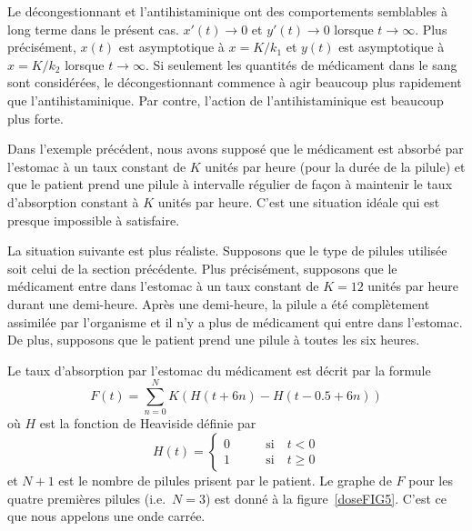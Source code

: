 {\begin{egg}


Le décongestionnant et l'antihistaminique ont des comportements semblables à
long terme dans le présent cas.  $x'(t) \rightarrow 0$ et
$y'(t) \rightarrow 0$ lorsque $t \rightarrow \infty$.  Plus précisément,
$x(t)$ est asymptotique à $x = K/k_1$ et $y(t)$ est asymptotique à
$x = K/k_2$ lorsque $t \rightarrow \infty$.  Si seulement les 
quantités de médicament dans le sang sont considérées, le
décongestionnant commence à agir beaucoup plus rapidement que
l'antihistaminique.  Par contre, l'action de l'antihistaminique est
beaucoup plus forte.


Dans l'exemple précédent, nous avons supposé que le médicament est
absorbé par l'estomac à un taux constant de $K$ unités par heure (pour
la durée de la pilule) et que le patient prend une pilule à intervalle
régulier de façon à maintenir le taux d'absorption constant à $K$
unités par heure.  C'est une situation idéale qui est presque
impossible à satisfaire.

La situation suivante est plus réaliste.  Supposons que le type de pilules
utilisée soit celui de la section précédente.  Plus précisément,
supposons que le médicament entre dans l'estomac à un taux constant de
$K=12$ unités par heure durant une demi-heure.  Après une demi-heure,
la pilule a été complètement assimilée par l'organisme et il n'y a
plus de médicament qui entre dans l'estomac.  De plus, supposons
que le patient prend une pilule à toutes les six heures.

Le taux d'absorption par l'estomac du médicament est décrit par la formule
\[
F(t) = \sum_{n=0}^N K (H(t + 6 n) - H(t - 0.5 + 6 n))
\]
où $H$ est la fonction de Heaviside définie par
\[
H(t) = \begin{cases}
0 & \qquad \text{si} \quad t<0 \\
1 & \qquad \text{si} \quad t\geq 0
\end{cases}
\]
et $N+1$ est le nombre de pilules prisent par le patient.  Le graphe
de $F$ pour les quatre premières pilules (i.e.\ $N=3$) est donné à la
figure~\ref{doseFIG5}.  C'est ce que nous appelons une onde carrée.


\end{egg}}
